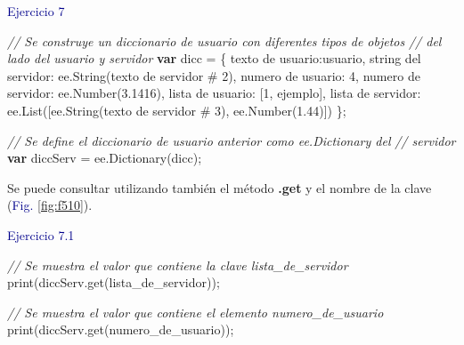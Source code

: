 \documentclass[
  12pt,
  letterpaper,
  twoside]{book}
\newenvironment{Shaded}{\begin{snugshade}}{\end{snugshade}}
\newcommand{\CommentTok}[1]{\textcolor[rgb]{0.24,0.58,0.00}{\textit{#1}}}
\newcommand{\DecValTok}[1]{\textcolor[rgb]{0.28,0.53,0.93}{#1}}
\newcommand{\FloatTok}[1]{\textcolor[rgb]{0.28,0.53,0.93}{#1}}
\newcommand{\FunctionTok}[1]{\textcolor[rgb]{0.48,0.12,0.64}{#1}}
\newcommand{\KeywordTok}[1]{\textcolor[rgb]{0.00,0.00,0.00}{\textbf{#1}}}
\newcommand{\NormalTok}[1]{#1}
\newcommand{\OperatorTok}[1]{\textcolor[rgb]{0.00,0.00,0.00}{#1}}
\newcommand{\StringTok}[1]{\textcolor[rgb]{0.87,0.29,0.22}{#1}}
\newcommand\boldpurple[1]{\textcolor{darkpurple}{\textbf{#1}}}
\begin{document}
\textcolor{darkblue}{Ejercicio 7}

\begin{Shaded}
\begin{Highlighting}[]
\CommentTok{// Se construye un diccionario de usuario con diferentes tipos de objetos}
\CommentTok{// del lado del usuario y servidor}
\KeywordTok{var}\NormalTok{ dicc }\OperatorTok{=}\NormalTok{ \{                                                 }
  \StringTok{\textquotesingle{}texto de usuario\textquotesingle{}}\OperatorTok{:}\StringTok{\textquotesingle{}usuario\textquotesingle{}}\OperatorTok{,}
  \StringTok{\textquotesingle{}string del servidor\textquotesingle{}}\OperatorTok{:}\NormalTok{ ee}\OperatorTok{.}\FunctionTok{String}\NormalTok{(}\StringTok{\textquotesingle{}texto de servidor \# 2\textquotesingle{}}\NormalTok{)}\OperatorTok{,}
  \StringTok{\textquotesingle{}numero de usuario\textquotesingle{}}\OperatorTok{:} \DecValTok{4}\OperatorTok{,}
  \StringTok{\textquotesingle{}numero de servidor\textquotesingle{}}\OperatorTok{:}\NormalTok{ ee}\OperatorTok{.}\FunctionTok{Number}\NormalTok{(}\FloatTok{3.1416}\NormalTok{)}\OperatorTok{,}
  \StringTok{\textquotesingle{}lista de usuario\textquotesingle{}}\OperatorTok{:}\NormalTok{ [}\DecValTok{1}\OperatorTok{,} \StringTok{\textquotesingle{}ejemplo\textquotesingle{}}\NormalTok{]}\OperatorTok{,}
  \StringTok{\textquotesingle{}lista de servidor\textquotesingle{}}\OperatorTok{:}\NormalTok{ ee}\OperatorTok{.}\FunctionTok{List}\NormalTok{([ee}\OperatorTok{.}\FunctionTok{String}\NormalTok{(}\StringTok{\textquotesingle{}texto de servidor \# 3\textquotesingle{}}\NormalTok{)}\OperatorTok{,} 
\NormalTok{    ee}\OperatorTok{.}\FunctionTok{Number}\NormalTok{(}\FloatTok{1.44}\NormalTok{)])}
\NormalTok{\}}\OperatorTok{;} 

\CommentTok{// Se define el diccionario de usuario anterior como ee.Dictionary del }
\CommentTok{// servidor }
\KeywordTok{var}\NormalTok{ diccServ }\OperatorTok{=}\NormalTok{ ee}\OperatorTok{.}\FunctionTok{Dictionary}\NormalTok{(dicc)}\OperatorTok{;}     
\end{Highlighting}
\end{Shaded}

Se puede consultar utilizando también el método \boldpurple{.get} y el nombre de la clave (\textcolor{darkblue}{Fig.} \ref{fig:f510}).

\textcolor{darkblue}{Ejercicio 7.1}

\begin{Shaded}
\begin{Highlighting}[]
\CommentTok{// Se muestra el valor que contiene la clave \textquotesingle{}lista\_de\_servidor\textquotesingle{}}
\FunctionTok{print}\NormalTok{(diccServ}\OperatorTok{.}\FunctionTok{get}\NormalTok{(}\StringTok{\textquotesingle{}lista\_de\_servidor\textquotesingle{}}\NormalTok{))}\OperatorTok{;}

\CommentTok{// Se muestra el valor que contiene el elemento \textquotesingle{}numero\_de\_usuario   }
\FunctionTok{print}\NormalTok{(diccServ}\OperatorTok{.}\FunctionTok{get}\NormalTok{(}\StringTok{\textquotesingle{}numero\_de\_usuario\textquotesingle{}}\NormalTok{))}\OperatorTok{;}        
\end{Highlighting}
\end{Shaded}
\end{document}
